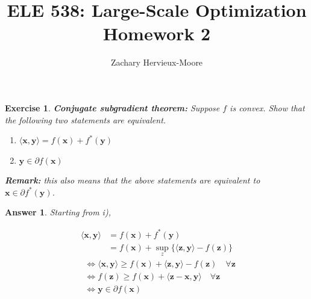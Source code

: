 \documentclass[12pt]{article}
\title{ELE 538: Large-Scale Optimization \\ Homework 2}
\author{Zachary Hervieux-Moore}
\date{\displaydate{date}}
\theoremstyle{colon}
\newtheorem{exercise}{Exercise}
\newtheorem*{answer}{Answer}
\begin{document}
\maketitle

\clearpage

\begin{exercise}
	\textbf{Conjugate subgradient theorem:} Suppose $f$ is convex. Show that the following two statements are equivalent.
	\begin{enumerate}[label=\roman*)]
		\item $\langle \bm{x}, \bm{y} \rangle = f(\bm{x}) + f^* (\bm{y})$
		\item $\bm{y} \in \partial f(\bm{x})$
	\end{enumerate}
	\textbf{Remark:} this also means that the above statements are equivalent to $\bm{x} \in \partial f^* (\bm{y})$.
\end{exercise}

\begin{answer}

	Starting from i),

	\begin{align*}
		\langle \bm{x}, \bm{y} \rangle &= f(\bm{x}) + f^*(\bm{y}) \\
		&= f(\bm{x}) + \sup_z \{ \langle \bm{z}, \bm{y} \rangle - f(\bm{z}) \}
	\end{align*}
	\begin{align*}
		&\Longleftrightarrow \langle \bm{x}, \bm{y} \rangle \geq f(\bm{x}) + \langle \bm{z}, \bm{y} \rangle - f(\bm{z}) \quad \forall \bm{z} \\
		&\Longleftrightarrow f(\bm{z}) \geq f(\bm{x}) + \langle \bm{z} - \bm{x}, \bm{y} \rangle \quad \forall \bm{z} \\
		&\Longleftrightarrow \bm{y} \in \partial f(\bm{x})
	\end{align*}

\end{answer}

\clearpage
\end{document}
